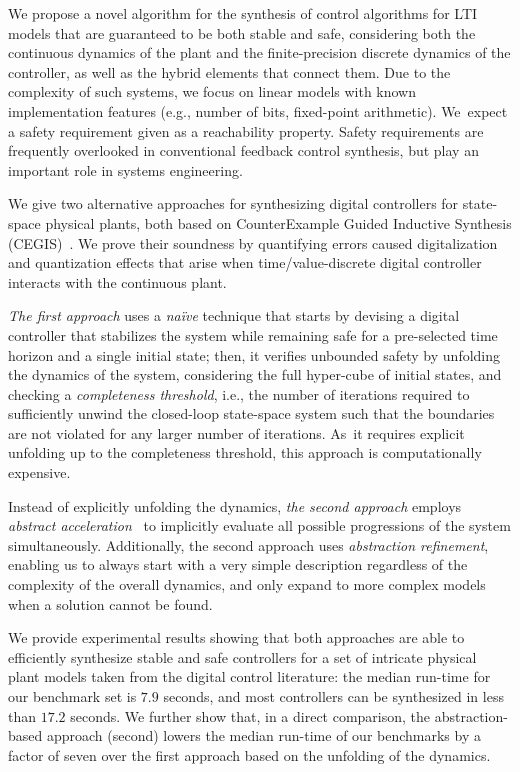 \documentclass[runningheads,a4paper]{llncs}
\begin{document}
We propose a novel algorithm for the synthesis of control algorithms for LTI
models that are guaranteed to be both stable and safe, considering both the
continuous dynamics of the plant and the finite-precision discrete dynamics
of the controller, as well as the hybrid elements that connect them.
%
%
Due to the complexity of such systems, we focus on linear models with known
implementation features (e.g., number of bits, fixed-point arithmetic). 
We~expect a safety requirement given as a reachability property.  Safety
requirements are frequently overlooked in conventional feedback control
synthesis, but play an important role in systems engineering.

We give two alternative approaches for synthesizing digital controllers for
state-space physical plants, both based on CounterExample Guided Inductive
Synthesis (CEGIS)~\cite{sketch}.  We prove their soundness by quantifying
errors caused digitalization and quantization effects that arise when
time/value-discrete digital controller interacts with the continuous plant.

{\em The first approach} uses a {\em na\"ive} technique that starts by
devising a digital controller that stabilizes the system while remaining
safe for a pre-selected time horizon and a single initial state; then, it
verifies unbounded safety by unfolding the dynamics of the system,
considering the full hyper-cube of initial states, and checking a {\em
completeness threshold}, i.e., the number of iterations required to
sufficiently unwind the closed-loop state-space system such that the
boundaries are not violated for any larger number of iterations.  As~it
requires explicit unfolding up to the completeness threshold, this approach
is computationally expensive.

Instead of explicitly unfolding the dynamics, {\em the second approach}
employs {\em abstract acceleration}~\cite{cattaruzza2015unbounded} to
implicitly evaluate all possible progressions of the system simultaneously. 
Additionally, the second approach uses {\em abstraction refinement},
enabling us to always start with a very simple description regardless of the
complexity of the overall dynamics, and only expand to more complex models
when a solution cannot be found.

We provide experimental results showing that both approaches are able to
efficiently synthesize stable and safe controllers for a set of intricate
physical plant models taken from the digital control literature: the median
run-time for our benchmark set is $7.9$ seconds, and most controllers can be
synthesized in less than $17.2$ seconds.  We further show that, in a direct
comparison, the abstraction-based approach (second) lowers the median
run-time of our benchmarks by a factor of seven over the first approach
based on the unfolding of the dynamics.
\end{document}
